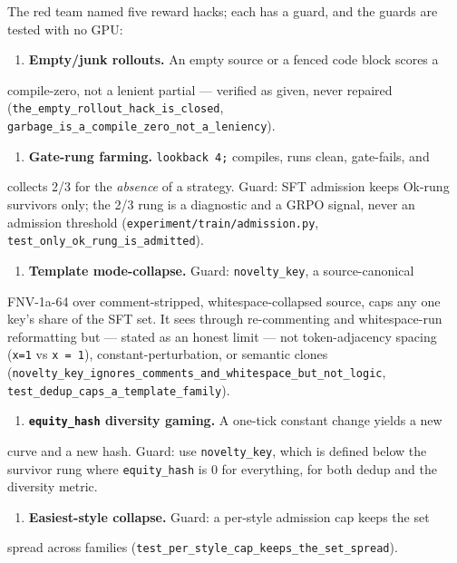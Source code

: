 \documentclass[11pt]{article}
\newcommand{\code}[1]{\texttt{#1}}
\begin{document}
The red team named five reward hacks; each has a guard, and the guards are
tested with no GPU:

\begin{enumerate}[leftmargin=*]
\item \textbf{Empty/junk rollouts.} An empty source or a fenced code block scores a
\end{enumerate}
   compile-zero, not a lenient partial --- verified as given, never repaired
   (\code{the\_empty\_rollout\_hack\_is\_closed},
   \code{garbage\_is\_a\_compile\_zero\_not\_a\_leniency}).
\begin{enumerate}[leftmargin=*]
\item \textbf{Gate-rung farming.} \code{lookback 4;} compiles, runs clean, gate-fails, and
\end{enumerate}
   collects 2/3 for the \emph{absence} of a strategy. Guard: SFT admission keeps
   Ok-rung survivors only; the 2/3 rung is a diagnostic and a GRPO signal, never
   an admission threshold (\code{experiment/train/admission.py},
   \code{test\_only\_ok\_rung\_is\_admitted}).
\begin{enumerate}[leftmargin=*]
\item \textbf{Template mode-collapse.} Guard: \code{novelty\_key}, a source-canonical
\end{enumerate}
   FNV-1a-64 over comment-stripped, whitespace-collapsed source, caps any one
   key's share of the SFT set. It sees through re-commenting and whitespace-run
   reformatting but --- stated as an honest limit --- not token-adjacency spacing
   (\code{x=1} vs \code{x = 1}), constant-perturbation, or semantic clones
   (\code{novelty\_key\_ignores\_comments\_and\_whitespace\_but\_not\_logic},
   \code{test\_dedup\_caps\_a\_template\_family}).
\begin{enumerate}[leftmargin=*]
\item \textbf{\code{equity\_hash} diversity gaming.} A one-tick constant change yields a new
\end{enumerate}
   curve and a new hash. Guard: use \code{novelty\_key}, which is defined below the
   survivor rung where \code{equity\_hash} is 0 for everything, for both dedup and the
   diversity metric.
\begin{enumerate}[leftmargin=*]
\item \textbf{Easiest-style collapse.} Guard: a per-style admission cap keeps the set
\end{enumerate}
   spread across families (\code{test\_per\_style\_cap\_keeps\_the\_set\_spread}).
\end{document}
